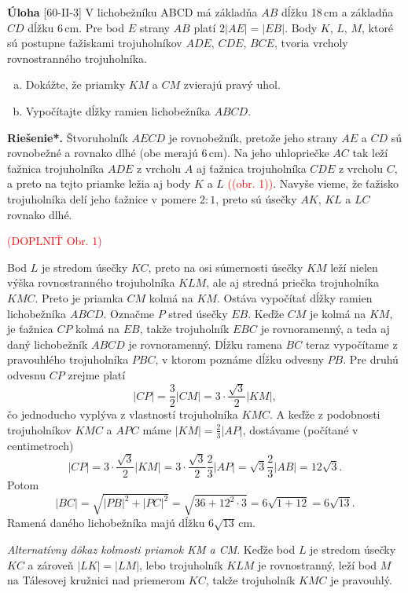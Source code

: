 \documentclass{article}
\newcommand{\rieh}{\textbf{Riešenie*.} }
\newcommand\todo[1]{\noindent\textcolor{red}{(#1)}}
\newcommand{\problem}[3]{
  \begin{tcolorbox}[breakable,notitle,boxrule=0pt,colback=light-gray,colframe=light-gray]
    \textbf{Úloha}
    [#1] #2
  \end{tcolorbox}
  \noindent#3
}
\begin{document}
\problem{60-II-3}{
V lichobežníku ABCD má základňa $AB$ dĺžku 18\,cm a základňa $CD$ dĺžku 6\,cm. Pre bod $E$ strany $AB$ platí $2|AE| = |EB|$. Body $K$, $L$, $M$, ktoré sú postupne ťažiskami trojuholníkov $ADE$, $CDE$, $BCE$, tvoria vrcholy rovnostranného trojuholníka. 
\begin{enumerate}[a)]
    \item Dokážte, že priamky $KM$ a $CM$ zvierajú pravý uhol.
    \item Vypočítajte dĺžky ramien lichobežníka $ABCD$.
\end{enumerate}
}{
\rieh Štvoruholník $AECD$ je rovnobežník, pretože jeho strany $AE$ a $CD$ sú rovnobežné a rovnako dlhé (obe merajú 6\,cm). Na jeho uhlopriečke $AC$ tak leží ťažnica trojuholníka $ADE$ z vrcholu $A$ aj ťažnica trojuholníka $CDE$ z vrcholu $C$, a preto na tejto priamke ležia aj body $K$ a $L$ \todo{(obr. 1)}. Navyše vieme, že ťažisko trojuholníka delí jeho ťažnice v pomere $2 : 1$, preto sú úsečky $AK$, $KL$ a $LC$ rovnako dlhé.

\todo{DOPLNIŤ Obr. 1}

Bod $L$ je stredom úsečky $KC$, preto na osi súmernosti úsečky $KM$ leží nielen výška rovnostranného trojuholníka $KLM$, ale aj stredná priečka trojuholníka $KMC$. Preto je priamka $CM$ kolmá na $KM$. Ostáva vypočítať dĺžky ramien lichobežníka $ABCD$. Označme $P$ stred úsečky $EB$. Keďže $CM$ je kolmá na $KM$, je ťažnica $CP$ kolmá na $EB$, takže trojuholník $EBC$ je rovnoramenný, a teda aj daný lichobežník $ABCD$ je rovnoramenný. Dĺžku ramena $BC$ teraz vypočítame z pravouhlého trojuholníka $PBC$, v ktorom poznáme dĺžku odvesny $PB$. Pre druhú odvesnu $CP$ zrejme platí
$$|CP| = \frac{3}{2} |CM| = 3\cdot \frac{\sqrt{3}}{2}|KM|,$$
čo jednoducho vyplýva z vlastností trojuholníka $KMC$. A keďže z podobnosti trojuholníkov $KMC$ a $APC$ máme $|KM| =\frac{2}{3}|AP|$, dostávame (počítané v centimetroch)
$$|CP| = 3\cdot \frac{\sqrt{3}}{2}|KM| = 3\cdot \frac{\sqrt{3}}{2}\frac{2}{3}|AP| =\sqrt{3}\frac{2}{3}|AB| = 12\sqrt{3}.$$
Potom
$$|BC| =\sqrt{|PB|^2 + |PC|^2} =\sqrt{36 + 12^2\cdot3} = 6\sqrt{1 + 12} = 6\sqrt{13}.$$
Ramená daného lichobežníka majú dĺžku $6\sqrt{13}$\,cm.

\textit{Alternatívny dôkaz kolmosti priamok KM a CM}. Keďže bod $L$ je stredom úsečky $KC$ a zároveň $|LK| = |LM|$, lebo trojuholník $KLM$ je rovnostranný, leží bod $M$ na Tálesovej kružnici nad priemerom $KC$, takže trojuholník $KMC$ je pravouhlý.
}
\end{document}
